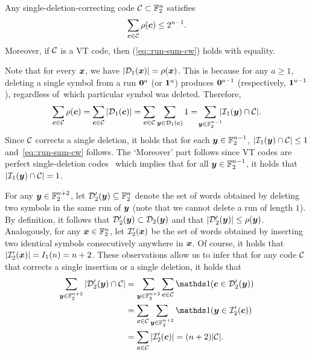 \documentclass[conference, a4paper]{IEEEtran}
\begin{document}
\begin{claim} \label{cl::sum-runs-vt-code}
    Any single-deletion-correcting code $\mathcal{C} \subset \mathbb{F}_2^n$ satisfies
    \begin{equation}
        \sum_{{\boldsymbol c} \in \mathcal{C}} \rho({\boldsymbol c}) \leq 2^{n-1}. \label{eq::run-sum-cw}
    \end{equation} 
    Moreover, if $\mathcal{C}$ is a VT code, then (\ref{eq::run-sum-cw}) holds with equality.
\end{claim}
\begin{IEEEproof}
    Note that for every ${\boldsymbol x}$, we have $|\mathcal{D}_{1}({\boldsymbol x})| = \rho({\boldsymbol x})$. This is because for any $a \geq 1$, deleting a single symbol from a run ${\mathbf 0}^{a}$ (or ${\mathbf 1}^{a}$) produces ${\mathbf 0}^{a-1}$ (respectively, ${\mathbf 1}^{a-1}$), regardless of~which particular symbol was deleted.
    Therefore,
    \begin{align*}
        \sum_{{\boldsymbol c} \in \mathcal{C}} \rho({\boldsymbol c}) = \sum_{{\boldsymbol c} \in \mathcal{C}} |\mathcal{D}_{1}({\boldsymbol c})|
         = \sum_{{\boldsymbol c} \in \mathcal{C}} \sum_{{\boldsymbol y} \in \mathcal{D}_{1}({\boldsymbol c})} 1
        = \! \sum_{{\boldsymbol y} \in \mathbb{F}_2^{n-1}} \!\!\! |\mathcal{I}_{1}({\boldsymbol y}) \cap \mathcal{C}|.
    \end{align*}
    Since $\mathcal{C}$ corrects a single deletion, it holds that for each ${\boldsymbol y} \in \mathbb{F}_2^{n-1}$, $|\mathcal{I}_{1}({\boldsymbol y}) \cap \mathcal{C}| \leq 1$ and~\eqref{eq::run-sum-cw} follows. 
    The `Moreover' part follows since VT codes are perfect single-deletion codes~\cite{sloaneSingleDeletionCorrectingCodes2002} which implies that for all ${\boldsymbol y} \in \mathbb{F}_2^{n-1}$, it holds that ${|\mathcal{I}_{1}({\boldsymbol y}) \cap \mathcal{C}| = 1}$.
\end{IEEEproof}

For any ${\boldsymbol y} \in \mathbb{F}_2^{n+2}$, let $\mathcal{D}'_{2}({\boldsymbol y}) \subseteq \mathbb{F}_2^{n}$ denote the set of words obtained by deleting two symbols in the same run of ${\boldsymbol y}$ (note that we cannot delete a run of length $1$). 
By definition, it follows that $\mathcal{D}'_{2}({\boldsymbol y}) \subset \mathcal{D}_{2}({\boldsymbol y})$ and that $|\mathcal{D}'_{2}({\boldsymbol y})| \leq \rho({\boldsymbol y})$. Analogously, for any ${\boldsymbol x} \in \mathbb{F}_2^n$, let $\mathcal{I}'_{2}({\boldsymbol x})$ be the set of words obtained by inserting two identical symbols consecutively anywhere in ${\boldsymbol x}$. Of course, it holds that $|\mathcal{I}'_{2}({\boldsymbol x})| = I_1(n) = n+2$. These observations allow us to infer that for any code $\mathcal{C}$ that corrects a single insertion or a single deletion, it holds that
\begin{align}
    \sum_{\bfy \in \Ftwo^{n+2}} |\balldelp{\bfy}{2} \cap \cC| &= \sum_{\bfy \in \Ftwo^{n+2}} \sum_{\bfc \in \cC} \indicator(\bfc \in \balldelp{\bfy}{2}) \nonumber \\    
    &= \sum_{\bfc \in \cC} \sum_{\bfy \in \Ftwo^{n+2}}  \indicator(\bfy \in \ballinsp{\bfc}{2}) \nonumber \\
    &= \sum_{\bfc \in \cC} |\ballinsp{\bfc}{2}| = (n+2)|\cC|. \label{eq::d2p-bound}
\end{align}

\end{document}

